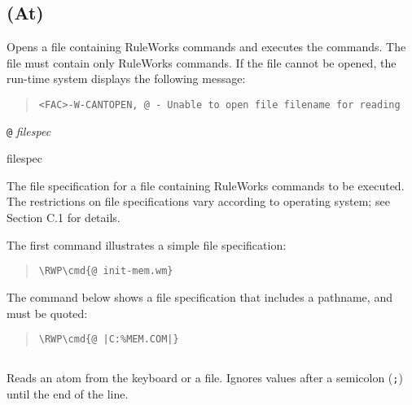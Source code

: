 \subsection{ (At)}

Opens a file containing RuleWorks commands and executes the
commands. The file must contain only RuleWorks commands. If the file
cannot be opened, the run-time system displays the following message:

\begin{quote}
\begin{verbatim}
<FAC>-W-CANTOPEN, @ - Unable to open file filename for reading
\end{verbatim}
\end{quote}

\Format

\verb|@| \it{filespec}

\begin{arguments}
\item[filespec]

  The file specification for a file containing RuleWorks commands to
  be executed. The restrictions on file specifications vary according
  to operating system; see Section C.1 for details.
\end{arguments}

\Example

The first command illustrates a simple file specification:

\begin{quote}
\begin{Verbatim}[commandchars=\\\{\}]
\RWP\cmd{@ init-mem.wm}
\end{Verbatim}
\end{quote}

The command below shows a file specification that includes a pathname,
and must be quoted:

\begin{quote}
\begin{Verbatim}[commandchars=\\\{\}]
\RWP\cmd{@ |C:%MEM.COM|}
\end{Verbatim}
\end{quote}

\subsection{}

Reads an atom from the keyboard or a file. Ignores values after a
semicolon (\verb|;|) until the end of the line.

